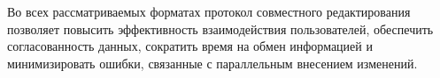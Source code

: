 Во всех рассматриваемых форматах протокол совместного редактирования позволяет повысить эффективность взаимодействия пользователей, обеспечить согласованность данных, сократить время на обмен информацией и минимизировать ошибки, связанные с параллельным внесением изменений.










